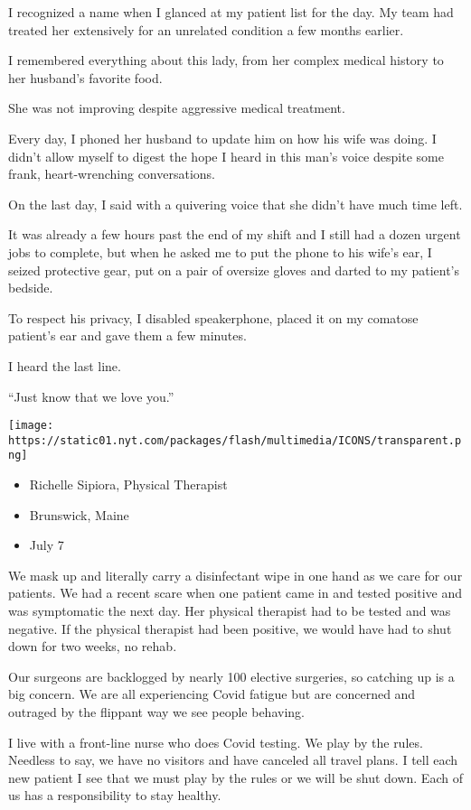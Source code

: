 I recognized a name when I glanced at my patient list for the day. My
team had treated her extensively for an unrelated condition a few months
earlier.

I remembered everything about this lady, from her complex medical
history to her husband's favorite food.

She was not improving despite aggressive medical treatment.

Every day, I phoned her husband to update him on how his wife was doing.
I didn't allow myself to digest the hope I heard in this man's voice
despite some frank, heart-wrenching conversations.

On the last day, I said with a quivering voice that she didn't have much
time left.

It was already a few hours past the end of my shift and I still had a
dozen urgent jobs to complete, but when he asked me to put the phone to
his wife's ear, I seized protective gear, put on a pair of oversize
gloves and darted to my patient's bedside.

To respect his privacy, I disabled speakerphone, placed it on my
comatose patient's ear and gave them a few minutes.

I heard the last line.

``Just know that we love you.''

\texttt{[image: https://static01.nyt.com/packages/flash/multimedia/ICONS/transparent.png]}

\begin{itemize}
\tightlist
\item
  Richelle Sipiora, Physical Therapist
\item
  Brunswick, Maine
\item
  July 7
\end{itemize}

We mask up and literally carry a disinfectant wipe in one hand as we
care for our patients. We had a recent scare when one patient came in
and tested positive and was symptomatic the next day. Her physical
therapist had to be tested and was negative. If the physical therapist
had been positive, we would have had to shut down for two weeks, no
rehab.

Our surgeons are backlogged by nearly 100 elective surgeries, so
catching up is a big concern. We are all experiencing Covid fatigue but
are concerned and outraged by the flippant way we see people behaving.

I live with a front-line nurse who does Covid testing. We play by the
rules. Needless to say, we have no visitors and have canceled all travel
plans. I tell each new patient I see that we must play by the rules or
we will be shut down. Each of us has a responsibility to stay healthy.

